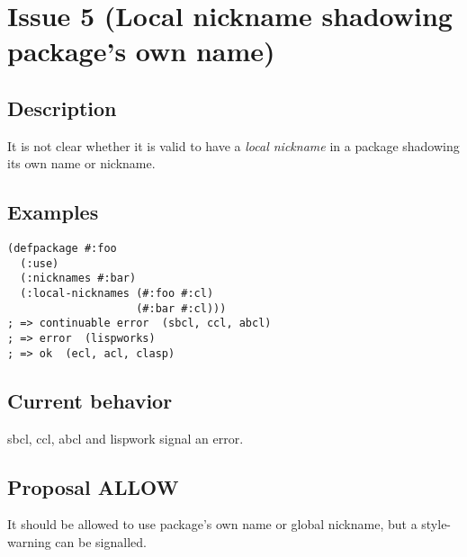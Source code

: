 \documentclass[11pt]{article}
\author{Grolter Bell}
\date{\today}
\title{}
\begin{document}
\section{Issue 5 (Local nickname shadowing package's own name)}
\label{sec:orgb79e457}
\subsection{Description}
\label{sec:org7b74f89}
It is not clear whether it is valid to have a \emph{local nickname} in a package
shadowing its own name or nickname.
\subsection{Examples}
\label{sec:org7fa37f7}
\begin{verbatim}
(defpackage #:foo
  (:use)
  (:nicknames #:bar)
  (:local-nicknames (#:foo #:cl)
                    (#:bar #:cl)))
; => continuable error  (sbcl, ccl, abcl)
; => error  (lispworks)
; => ok  (ecl, acl, clasp)
\end{verbatim}
\subsection{Current behavior}
\label{sec:org4888966}
sbcl, ccl, abcl and lispwork signal an error.
\subsection{Proposal ALLOW}
\label{sec:orgc5c0ef4}
It should be allowed to use package's own name or global nickname, but a
style-warning can be signalled.
\end{document}
